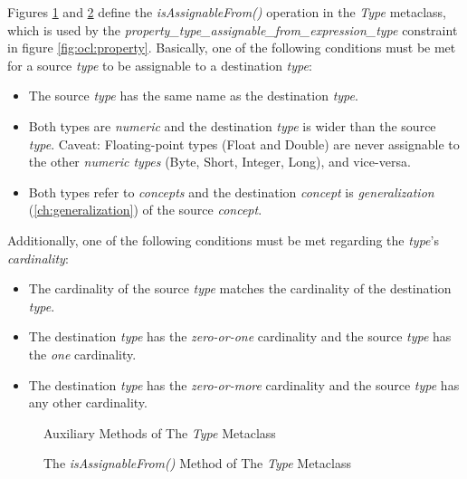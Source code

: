 Figures \ref{fig:ocl:type_a} and \ref{fig:ocl:type_b} define the \emph{isAssignableFrom()}
operation in the \emph{Type} metaclass,
which is used by the \emph{property\_type\_assignable\_from\_expression\_type}
constraint in figure \ref{fig:ocl:property}.
Basically, one of the following conditions must be met for a source \emph{type}
to be assignable to a destination \emph{type}:

\begin{itemize}

\item The source \emph{type} has the same name as the destination \emph{type}.

\item Both types are \emph{numeric} and the destination \emph{type} is wider than the source \emph{type}.
Caveat: Floating-point types (Float and Double) are never assignable to the other \emph{numeric types}
(Byte, Short, Integer, Long), and vice-versa.

\item Both types refer to \emph{concepts} and the destination \emph{concept}
is \emph{generalization} (\ref{ch:generalization}) of the source \emph{concept}.

\end{itemize}

Additionally, one of the following conditions must be met regarding the \emph{type}'s \emph{cardinality}:

\begin{itemize}

\item The cardinality of the source \emph{type} matches the cardinality of the destination \emph{type}.

\item The destination \emph{type} has the \emph{zero-or-one} cardinality and the source \emph{type} has the \emph{one} cardinality.

\item The destination \emph{type} has the \emph{zero-or-more} cardinality and the source \emph{type} has any other cardinality.

\end{itemize}

\begin{figure}

\caption{Auxiliary Methods of The \emph{Type} Metaclass}
\label{fig:ocl:type_a}
\end{figure}

\begin{figure}

\caption{The \emph{isAssignableFrom()} Method of The \emph{Type} Metaclass}
\label{fig:ocl:type_b}
\end{figure}
